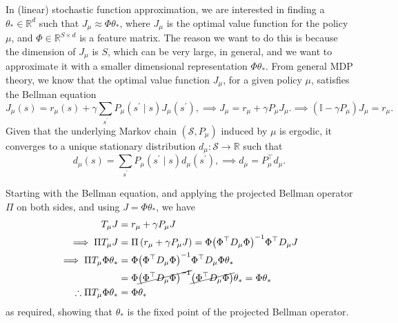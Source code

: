 In (linear) stochastic function approximation, we are interested in finding a \( \theta_\ast \in \mathbb{R}^{d} \) such that \( J_\mu \approx \Phi \theta_\ast \), where \( J_\mu \) is the optimal value function for the policy \( \mu \), and \( \Phi \in \mathbb{R}^{S \times d} \) is a feature matrix.
The reason we want to do this is because the dimension of \( J_\mu \) is \( S \), which can be very large, in general, and we want to approximate it with a smaller dimensional representation \( \Phi \theta_\ast \).
From general MDP theory, we know that the optimal value function \( J_\mu \), for a given policy \( \mu \), satisfies the Bellman equation
\[
    J_\mu(s) = r_{\mu}(s) + \gamma \sum_{s^{\prime}} P_{\mu}(s^{\prime} \mid s) J_\mu(s^{\prime}),
    \implies
    J_\mu = r_{\mu} + \gamma P_{\mu} J_\mu.
    \implies
    \left(\mathbb{I}-\gamma P_{\mu}\right) J_\mu = r_{\mu}.
\]
Given that the underlying Markov chain \( \left(\mathcal{S}, P_{\mu}\right) \) induced by \( \mu \) is ergodic, it converges to a unique stationary distribution \( d_{\mu}: \mathcal{S} \rightarrow \mathbb{R} \) such that
\[
    d_{\mu}(s) = \sum_{s^{\prime}} P_{\mu}(s^{\prime} \mid s) d_{\mu}(s^{\prime}),
    \implies
    d_{\mu} = P_{\mu}^{\top} d_{\mu}.
\]

Starting with the Bellman equation, and applying the projected Bellman operator \( \Pi \) on both sides, and using \( J = \Phi \theta_\ast \), we have
\begin{align*}
    T_{\mu} J
     & =
    r_{\mu} + \gamma P_{\mu} J
    \\
    \implies
    \Pi T_{\mu} J
     & =
    \Pi \left(r_{\mu} + \gamma P_{\mu} J\right)
    =
    \Phi{\left(\Phi^{\top} D_{\mu} \Phi\right)}^{-1} \Phi^{\top} D_{\mu} J
    \\
    \implies
    \Pi T_{\mu} \Phi \theta_\ast
     & =
    \Phi{\left(\Phi^{\top} D_{\mu} \Phi\right)}^{-1} \Phi^{\top} D_{\mu} \Phi \theta_\ast
    \\ & =
    \Phi \cancel{{\left(\Phi^{\top} D_{\mu} \Phi\right)}^{-1}} \cancel{\left(\Phi^{\top} D_{\mu} \Phi\right)} \theta_\ast
    =
    \Phi \theta_\ast
    \\
    \therefore
    \Pi T_{\mu} \Phi \theta_\ast
     & =
    \Phi \theta_\ast
\end{align*}
as required, showing that \( \theta_\ast \) is the fixed point of the projected Bellman operator.

